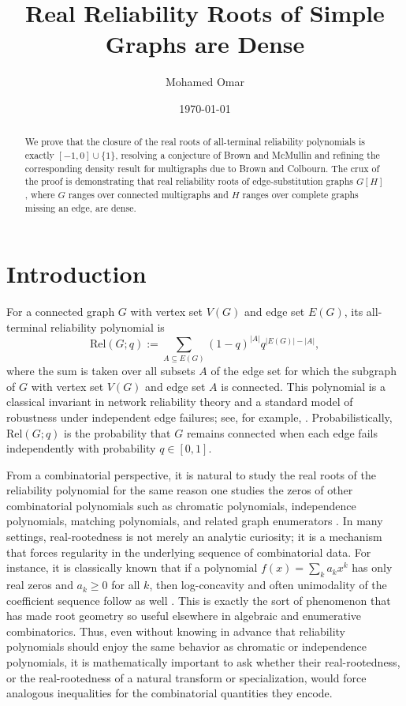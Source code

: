 \documentclass[12pt]{amsart}
\title{Real Reliability Roots of Simple Graphs are Dense}
\author{Mohamed Omar}
\date{\today}
\theoremstyle{definition}
\newcommand{\R}{\text{Rel}}
\begin{document}
\begin{abstract}
We prove that the closure of the real roots of all-terminal reliability polynomials is exactly $[-1,0] \cup \{1\}$, resolving a conjecture of Brown and McMullin and refining the corresponding density result for multigraphs due to Brown and Colbourn. The crux of the proof is demonstrating that real reliability roots of edge-substitution graphs $G[H]$, where $G$ ranges over connected multigraphs and $H$ ranges over complete graphs missing an edge, are dense.
\end{abstract}

\maketitle

\section{Introduction}
For a connected graph $G$ with vertex set $V(G)$ and edge set $E(G)$, its all-terminal reliability polynomial is
\[
\R(G;q) := \sum_{A \subseteq E(G)} (1-q)^{|A|}q^{|E(G)|-|A|},
\]
where the sum is taken over all subsets $A$ of the edge set for which the subgraph of $G$ with vertex set $V(G)$ and edge set $A$ is connected. This polynomial is a classical invariant in network reliability theory and a standard model of robustness under independent edge failures; see, for example, \cite{BrownSurvey2021,Colbourn1987,PerezRoses2018}. Probabilistically, $\R(G;q)$ is the probability that $G$ remains connected when each edge fails independently with probability $q \in [0,1]$.

From a combinatorial perspective, it is natural to study the real roots of the reliability polynomial for the same reason one studies the zeros of other combinatorial polynomials such as chromatic polynomials, independence polynomials, matching polynomials, and related graph enumerators \cite{ChudnovskySeymour2007,DongKohTeo2005,Godsil1993}. In many settings, real-rootedness is not merely an analytic curiosity; it is a mechanism that forces regularity in the underlying sequence of combinatorial data. For instance, it is classically known that if a polynomial $f(x)=\sum_{k} a_k x^k$ has only real zeros and $a_k\ge 0$ for all $k$, then  log-concavity and often unimodality of the coefficient sequence follow as well \cite{Comtet1974}. This is exactly the sort of phenomenon that has made root geometry so useful elsewhere in algebraic and enumerative combinatorics. Thus, even without knowing in advance that reliability polynomials should enjoy the same behavior as chromatic or independence polynomials, it is mathematically important to ask whether their real-rootedness, or the real-rootedness of a natural transform or specialization, would force analogous inequalities for the combinatorial quantities they encode.
\end{document}
